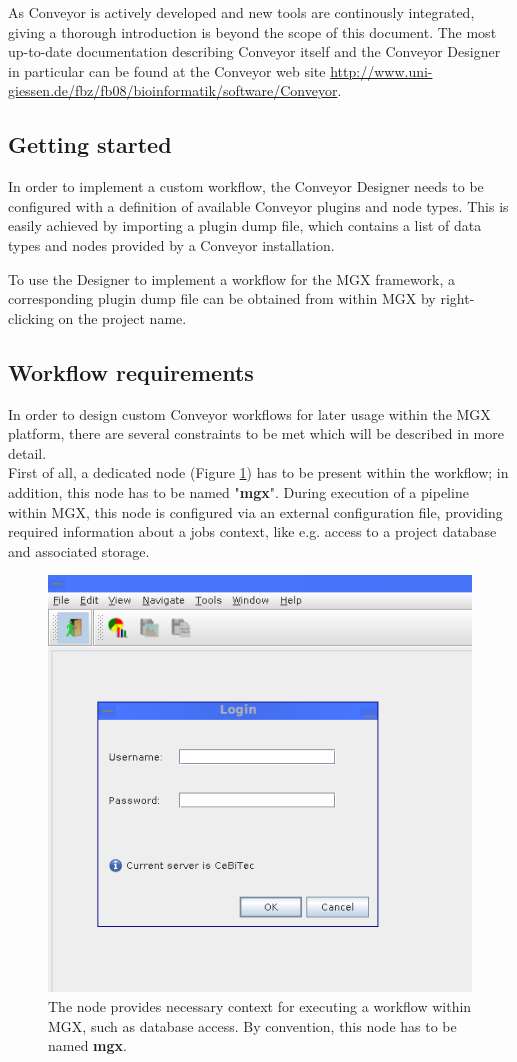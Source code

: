 As Conveyor is actively developed and new tools are continously integrated, giving a thorough
introduction is beyond the scope of this document. The most up-to-date documentation describing
Conveyor itself and the Conveyor Designer in particular can be found at the Conveyor web
site \url{http://www.uni-giessen.de/fbz/fb08/bioinformatik/software/Conveyor}.

\subsection{Getting started}

In order to implement a custom workflow, the Conveyor Designer needs to be configured
with a definition of available Conveyor plugins and node types. This is easily 
achieved by importing a plugin dump file, which contains a list of data types and
nodes provided by a Conveyor installation.

To use the Designer to implement a workflow for the MGX framework, a corresponding
plugin dump file can be obtained from within MGX by right-clicking on the 
project name.

\subsection{Workflow requirements}

In order to design custom Conveyor workflows for later usage within the MGX platform, there
are several constraints to be met which will be described in more detail.\\

First of all, a dedicated  node (Figure \ref{getmgxjob}) has to be present within the workflow; in addition,
this node has to be named "\textbf{mgx}". During execution of a pipeline within MGX, this node is
configured via an external configuration file, providing required information about a jobs
context, like e.g. access to a project database and associated storage.\\

\begin{figure}[ht]
\centering
\includegraphics[width=.5\textwidth]{img/login-screen}
\caption[]{The  node provides necessary context for executing a
workflow within MGX, such as database access. By convention, this node has to be named \textbf{mgx}.}
\label{getmgxjob}
\end{figure}


